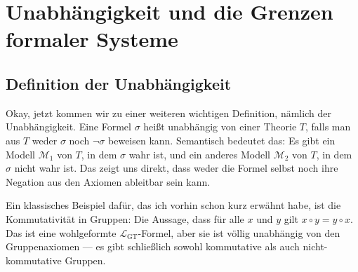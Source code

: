 
\section{Unabhängigkeit und die Grenzen formaler Systeme}
\subsection{Definition der Unabhängigkeit}

\begin{spoken-clean}[00:57:27 - 00:59:17]
Okay, jetzt kommen wir zu einer weiteren wichtigen Definition, nämlich der Unabhängigkeit. Eine Formel $\sigma$ heißt unabhängig von einer Theorie $T$, falls man aus $T$ weder $\sigma$ noch $\neg\sigma$ beweisen kann. Semantisch bedeutet das: Es gibt ein Modell $\mathcal{M}_1$ von $T$, in dem $\sigma$ wahr ist, und ein anderes Modell $\mathcal{M}_2$ von $T$, in dem $\sigma$ nicht wahr ist. Das zeigt uns direkt, dass weder die Formel selbst noch ihre Negation aus den Axiomen ableitbar sein kann.

Ein klassisches Beispiel dafür, das ich vorhin schon kurz erwähnt habe, ist die Kommutativität in Gruppen: Die Aussage, dass für alle $x$ und $y$ gilt $x \circ y = y \circ x$. Das ist eine wohlgeformte $\mathcal{L}_{\text{GT}}$-Formel, aber sie ist völlig unabhängig von den Gruppenaxiomen --- es gibt schließlich sowohl kommutative als auch nicht-kommutative Gruppen.
\end{spoken-clean}

